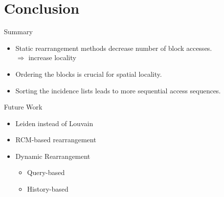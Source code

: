\documentclass[rgb]{beamer}
\begin{document}
    \section{Conclusion}
        \begin{frame}{Summary}
            \begin{itemize}
                \item Static rearrangement methods decrease number of block accesses. \\ [0.5em]
                $\Rightarrow$ increase locality \\ [3em]
                \item Ordering the blocks is crucial for spatial locality. \\ [3em]
                \item Sorting the incidence lists leads to more sequential access sequences. 
                \end{itemize}
        \end{frame}
    
        \begin{frame}{Future Work}
        \begin{itemize}
            \item Leiden instead of Louvain \\ [2em]
            \item RCM-based rearrangement \\ [2em]
            \item  Dynamic Rearrangement \\ [1.5em]
                \begin{itemize}
                 \item Query-based \\ [1em]
                 \item History-based 
                \end{itemize}

        \end{itemize}
        \end{frame}
\end{document}
